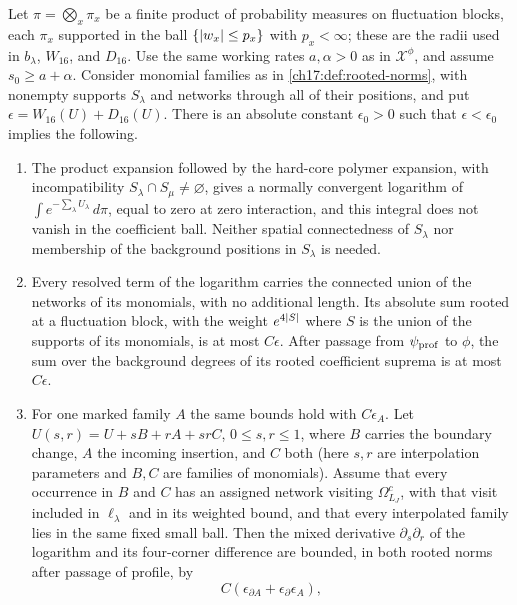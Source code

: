 \begin{lemma}\label{ch17:lem:decorated-white-log}
Let $\pi=\bigotimes_x\pi_x$ be a finite product of probability measures on fluctuation blocks, each $\pi_x$ supported in the ball $\{\lvert w_x\rvert\le p_x\}$ with $p_x<\infty$; these are the radii used in $b_\lambda$, $W_{16}$, and $D_{16}$. Use the same working rates $a,\alpha>0$ as in $\mathcal X^\phi$, and assume $s_0\ge a+\alpha$. Consider monomial families as in \cref{ch17:def:rooted-norms}, with nonempty supports $S_\lambda$ and networks through all of their positions, and put $\epsilon=W_{16}(U)+D_{16}(U)$. There is an absolute constant $\epsilon_0>0$ such that $\epsilon<\epsilon_0$ implies the following.
\begin{enumerate}
\item The product expansion followed by the hard-core polymer expansion, with incompatibility $S_\lambda\cap S_\mu\ne\varnothing$, gives a normally convergent logarithm of $\int e^{-\sum_\lambda U_\lambda}\,d\pi$, equal to zero at zero interaction, and this integral does not vanish in the coefficient ball. Neither spatial connectedness of $S_\lambda$ nor membership of the background positions in $S_\lambda$ is needed.
\item Every resolved term of the logarithm carries the connected union of the networks of its monomials, with no additional length. Its absolute sum rooted at a fluctuation block, with the weight $e^{4\lvert S\rvert}$ where $S$ is the union of the supports of its monomials, is at most $C\epsilon$. After passage from $\psi_{\mathrm{prof}}$ to $\phi$, the sum over the background degrees of its rooted coefficient suprema is at most $C\epsilon$.
\item For one marked family $A$ the same bounds hold with $C\epsilon_A$. Let $U(s,r)=U+sB+rA+srC$, $0\le s,r\le1$, where $B$ carries the boundary change, $A$ the incoming insertion, and $C$ both (here $s,r$ are interpolation parameters and $B,C$ are families of monomials). Assume that every occurrence in $B$ and $C$ has an assigned network visiting $\Omega^c_{L_J}$, with that visit included in $\ell_\lambda$ and in its weighted bound, and that every interpolated family lies in the same fixed small ball. Then the mixed derivative $\partial_s\partial_r$ of the logarithm and its four-corner difference are bounded, in both rooted norms after passage of profile, by
\begin{equation}\label{ch17:eq:exact-white-two-mark}
 C(\epsilon_{\partial A}+\epsilon_\partial\epsilon_A),
\end{equation}

\end{enumerate}
\end{lemma}
